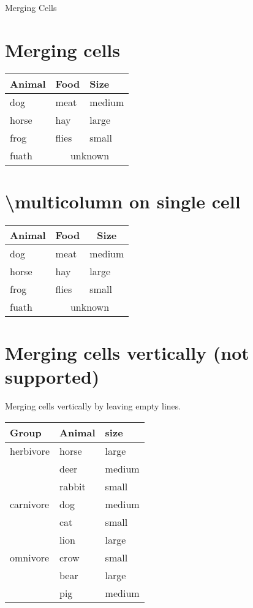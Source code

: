 \documentclass{article}
\begin{document}
Merging Cells

\section{Merging cells}
\begin{tabular}{lll}
    \toprule
    Animal  & Food  & Size      \\
    \midrule
    dog     & meat  & medium    \\
    horse   & hay   & large     \\
    frog    & flies & small     \\
    fuath   & \multicolumn{2}{c}{unknown} \\
    \bottomrule
\end{tabular}

\section{\textbackslash multicolumn on single cell}
\begin{tabular}{lll}
    \toprule
    \multicolumn{1}{c}{Animal}  & \multicolumn{1}{c}{Food}  & \multicolumn{1}{c}{Size}  \\ %
    \midrule
    dog     & meat  & medium    \\
    horse   & hay   & large     \\
    frog    & flies & small     \\
    fuath   & \multicolumn{2}{c}{unknown} \\
    \bottomrule
\end{tabular}

\section{Merging cells vertically (not supported)}
Merging cells vertically by leaving empty lines.

\begin{tabular}{lll}
    \toprule
    Group       & Animal    & size      \\
    \midrule
    herbivore   & horse     & large     \\
                & deer      & medium    \\
                & rabbit    & small     \\
    \addlinespace
    carnivore   & dog       & medium    \\
                & cat       & small     \\
                & lion      & large     \\
    \addlinespace
    omnivore    & crow      & small     \\
                & bear      & large     \\
                & pig       & medium    \\
    \bottomrule
\end{tabular}
\end{document}
